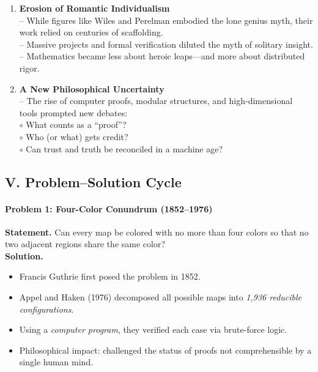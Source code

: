 \documentclass[9pt]{article}
\begin{document}
\begin{enumerate}
  \item \textbf{Erosion of Romantic Individualism} \\
  -- While figures like Wiles and Perelman embodied the lone genius myth, their work relied on centuries of scaffolding. \\
  -- Massive projects and formal verification diluted the myth of solitary insight. \\
  -- Mathematics became less about heroic leaps---and more about distributed rigor.

  \item \textbf{A New Philosophical Uncertainty} \\
  -- The rise of computer proofs, modular structures, and high-dimensional tools prompted new debates: \\
  \quad $\circ$ What counts as a ``proof''? \\
  \quad $\circ$ Who (or what) gets credit? \\
  \quad $\circ$ Can trust and truth be reconciled in a machine age?
\end{enumerate}

\newpage

\subsection*{V. Problem--Solution Cycle}

\paragraph{Problem 1: Four-Color Conundrum (1852--1976)}
\textbf{Statement.} Can every map be colored with no more than four colors so that no two adjacent regions share the same color? \\
\textbf{Solution.}
\begin{itemize}
  \item Francis Guthrie first posed the problem in 1852.
  \item Appel and Haken (1976) decomposed all possible maps into \textit{1,936 reducible configurations}.
  \item Using a \textit{computer program}, they verified each case via brute-force logic.
  \item Philosophical impact: challenged the status of proofs not comprehensible by a single human mind.
\end{itemize}
\end{document}
